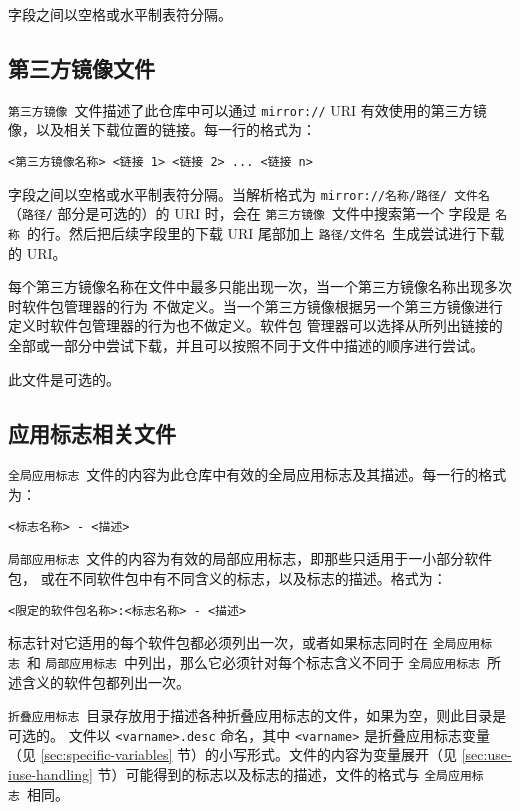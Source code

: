 字段之间以空格或水平制表符分隔。

\subsection{第三方镜像文件}
\label{sec:thirdpartymirrors}
\texttt{第三方镜像}\ 文件描述了此仓库中可以通过 \texttt{mirror://} URI
有效使用的第三方镜像，以及相关下载位置的链接。每一行的格式为：
\begin{verbatim}
<第三方镜像名称> <链接 1> <链接 2> ... <链接 n>
\end{verbatim}
字段之间以空格或水平制表符分隔。当解析格式为 \texttt{mirror:/\slash 名称\slash 路径\slash
文件名}（\texttt{路径/} 部分是可选的）的 URI 时，会在 \texttt{第三方镜像}\ 文件中搜索第一个
字段是 \texttt{名称}\ 的行。然后把后续字段里的下载 URI 尾部加上 \texttt{路径\slash 文件名}\
生成尝试进行下载的 URI。

每个第三方镜像名称在文件中最多只能出现一次，当一个第三方镜像名称出现多次时软件包管理器的行为
不做定义。当一个第三方镜像根据另一个第三方镜像进行定义时软件包管理器的行为也不做定义。软件包
管理器可以选择从所列出链接的全部或一部分中尝试下载，并且可以按照不同于文件中描述的顺序进行尝试。

此文件是可选的。

\subsection{应用标志相关文件}
\label{sec:use.desc}
\texttt{全局应用标志}\ 文件的内容为此仓库中有效的全局应用标志及其描述。每一行的格式为：
\begin{verbatim}
<标志名称> - <描述>
\end{verbatim}

\texttt{局部应用标志}\ 文件的内容为有效的局部应用标志，即那些只适用于一小部分软件包，
或在不同软件包中有不同含义的标志，以及标志的描述。格式为：
\begin{verbatim}
<限定的软件包名称>:<标志名称> - <描述>
\end{verbatim}
标志针对它适用的每个软件包都必须列出一次，或者如果标志同时在 \texttt{全局应用标志}\ 和
\texttt{局部应用标志}\ 中列出，那么它必须针对每个标志含义不同于 \texttt{全局应用标志}\
所述含义的软件包都列出一次。

\texttt{折叠应用标志}\ 目录存放用于描述各种折叠应用标志的文件，如果为空，则此目录是可选的。
文件以 \texttt{<varname>.desc} 命名，其中 \texttt{<varname>} 是折叠应用标志变量（见
\ref{sec:specific-variables} 节）的小写形式。文件的内容为变量展开（见 \ref{sec:use-iuse-handling}
节）可能得到的标志以及标志的描述，文件的格式与 \texttt{全局应用标志}\ 相同。


